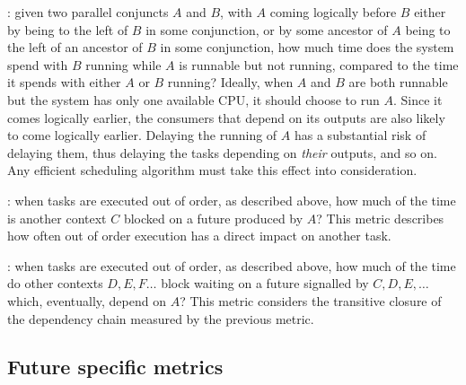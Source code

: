 :
given two parallel conjuncts $A$ and $B$,
with $A$ coming logically before $B$
either by being to the left of $B$ in some conjunction,
or by some ancestor of $A$ being to the left of an ancestor of $B$
in some conjunction,
how much time does the system spend with $B$ running
while $A$ is runnable but not running,
compared to the time it spends with either $A$ or $B$ running?
Ideally, when $A$ and $B$ are both runnable
but the system has only one available CPU,
it should choose to run $A$.
Since it comes logically earlier,
the consumers that depend on its outputs
are also likely to come logically earlier.
Delaying the running of $A$ has a substantial risk of delaying them,
thus delaying the tasks depending on \emph{their} outputs, and so on.
Any efficient scheduling algorithm
must take this effect into consideration.

:
when tasks are executed out of order, as described above,
how much of the time is another context $C$
blocked on a future produced by $A$?
This metric describes how often
out of order execution has a direct impact on another task.

:
when tasks are executed out of order, as described above,
how much of the time do other contexts $D, E, F\ldots$ block
waiting on a future signalled by $C, D, E, \ldots$
which, eventually, depend on $A$?
This metric considers the transitive closure of the dependency chain
measured by the previous metric.


\subsection{Future specific metrics}




